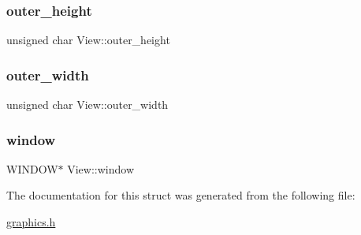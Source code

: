 \mbox{\label{structView_af9ea34821bea7809441b35c2eafae471}} 
\subsubsection{\texorpdfstring{outer\+\_\+height}{outer\_height}}
{\footnotesize\ttfamily unsigned char View\+::outer\+\_\+height}

\mbox{\label{structView_adb64f0c8ad4030517a9a885b6232f60e}} 
\subsubsection{\texorpdfstring{outer\+\_\+width}{outer\_width}}
{\footnotesize\ttfamily unsigned char View\+::outer\+\_\+width}

\mbox{\label{structView_afae41b4d514883d788de11054c0a9596}} 
\subsubsection{\texorpdfstring{window}{window}}
{\footnotesize\ttfamily W\+I\+N\+D\+OW$\ast$ View\+::window}



The documentation for this struct was generated from the following file\+:\begin{DoxyCompactItemize}
\item 
\hyperlink{graphics_8h}{graphics.\+h}\end{DoxyCompactItemize}

